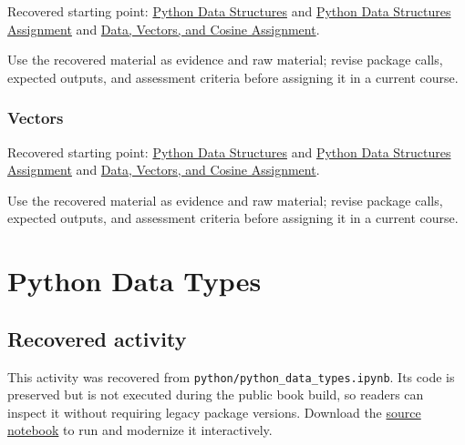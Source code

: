 \documentclass[
  letterpaper,
]{scrbook}
\begin{document}
Recovered starting point:
\hyperref[sec-lab-python-data-structures]{Python Data Structures} and
\hyperref[sec-lab-python-data-structures-assignment]{Python Data
Structures Assignment} and
\hyperref[sec-lab-data-initialization-assignment]{Data, Vectors, and
Cosine Assignment}.

Use the recovered material as evidence and raw material; revise package
calls, expected outputs, and assessment criteria before assigning it in
a current course.

\subsection*{Vectors}\label{sec-pr-02-vectors}

Recovered starting point:
\hyperref[sec-lab-python-data-structures]{Python Data Structures} and
\hyperref[sec-lab-python-data-structures-assignment]{Python Data
Structures Assignment} and
\hyperref[sec-lab-data-initialization-assignment]{Data, Vectors, and
Cosine Assignment}.

Use the recovered material as evidence and raw material; revise package
calls, expected outputs, and assessment criteria before assigning it in
a current course.

\chapter*{Python Data Types}\label{ch-lab-python-data-types}


\section*{Recovered activity}\label{sec-lab-python-data-types}


\begin{tcolorbox}[enhanced jigsaw, arc=.35mm, bottomrule=.15mm, bottomtitle=1mm, breakable, colback=white, colbacktitle=quarto-callout-note-color!10!white, colframe=quarto-callout-note-color-frame, coltitle=black, left=2mm, leftrule=.75mm, opacityback=0, opacitybacktitle=0.6, rightrule=.15mm, title=\textcolor{quarto-callout-note-color}{\faInfo}\hspace{0.5em}{Historical source and execution note}, titlerule=0mm, toprule=.15mm, toptitle=1mm]

This activity was recovered from
\texttt{python/python\_data\_types.ipynb}. Its code is preserved but is
not executed during the public book build, so readers can inspect it
without requiring legacy package versions. Download the
\href{../notebooks/python-data-types.ipynb}{source notebook} to run and
modernize it interactively.

\end{tcolorbox}
\end{document}

